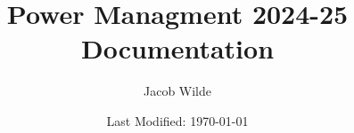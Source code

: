 \documentclass[12pt]{article}
\author{Jacob Wilde}
\title{Power Managment 2024-25 Documentation}
\date{Last Modified: \today}
\begin{document}
\maketitle
\pagebreak
\tableofcontents
\pagebreak



\end{document}
